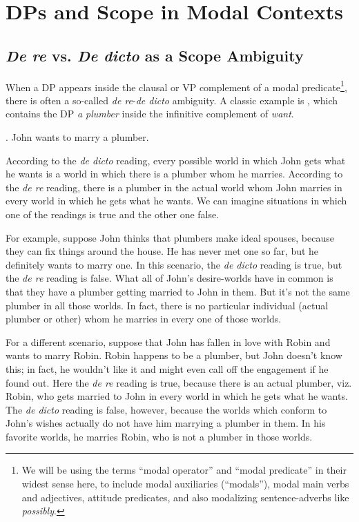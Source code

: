 

\chapter{DPs and Scope in Modal Contexts}


\minitoc

\section{\emph{De re} vs. \emph{De dicto} as a Scope Ambiguity}

When a DP appears inside the clausal or VP complement of a modal predicate\footnote{We will be using the terms ``modal operator'' and ``modal predicate'' in their widest sense here, to include modal auxiliaries (``modals''), modal main verbs and adjectives, attitude predicates, and also modalizing sentence-adverbs like \emph{possibly}. }, there is often a so-called \emph{de re}-\emph{de dicto} ambiguity. A classic example is \Next, which contains the DP \emph{a plumber} inside the infinitive complement of \emph{want}.

\ex. John wants to marry a plumber.

According to the \emph{de dicto} reading, every possible world in which John gets what he wants is a world in which there is a plumber whom he marries. According to the \emph{de re} reading, there is a plumber in the actual world whom John marries in every world in which he gets what he wants. We can imagine situations in which one of the readings is true and the other one false.

For example, suppose John thinks that plumbers make ideal spouses, because they can fix things around the house. He has never met one so far, but he definitely wants to marry one. In this scenario, the \emph{de dicto} reading is true, but the \emph{de re} reading is false. What all of John's desire-worlds have in common is that they have a plumber getting married to John in them. But it's not the same plumber in all those worlds. In fact, there is no particular individual (actual plumber or other) whom he marries in every one of those worlds.

For a different scenario, suppose that John has fallen in love with Robin and wants to marry Robin. Robin happens to be a plumber, but John doesn't know this; in fact, he wouldn't like it and might even call off the engagement if he found out. Here the \emph{de re} reading is true, because there is an actual plumber, viz. Robin, who gets married to John in every world in which he gets what he wants. The \emph{de dicto} reading is false, however, because the worlds which conform to John's wishes actually do not have him marrying a plumber in them. In his favorite worlds, he marries Robin, who is not a plumber in those worlds.

